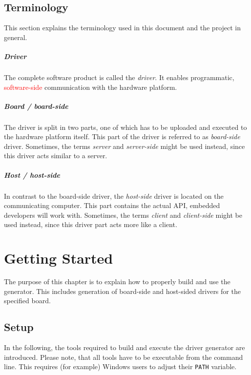 \documentclass{report}
\begin{document}
\section{Terminology}
\label{sec:term}
This section explains the terminology used in this document and the project in general.

\paragraph{Driver}
The complete software product is called the \textit{driver}. It enables programmatic, \textcolor{red}{software-side} communication with the hardware platform.

\paragraph{Board / board-side}
The driver is split in two parts, one of which has to be uploaded and executed to the hardware platform itself. This part of the driver is referred to as \textit{board-side} driver. Sometimes, the terms \textit{server} and \textit{server-side} might be used instead, since this driver acts similar to a server.

\paragraph{Host / host-side}
In contrast to the board-side driver, the \textit{host-side} driver is located on the communicating computer. This part contains the actual API, embedded developers will work with. Sometimes, the terms \textit{client} and \textit{client-side} might be used instead, since this driver part acts more like a client.


\chapter{Getting Started}
\label{sec:start}
The purpose of this chapter is to explain how to properly build and use the generator. This includes generation of board-side and host-sided drivers for the specified board.

\section{Setup}
\label{sec:setup}
In the following, the tools required to build and execute the driver generator are introduced. Please note, that all tools have to be executable from the command line. This requires (for example) Windows users to adjust their \texttt{PATH} variable.
\end{document}
